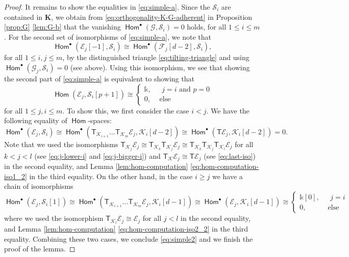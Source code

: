 \documentclass[a4paper,11pt, reqno]{amsart}
\def\KK{\mathbf K}
\def\sE{\mathscr{E}}
\def\sF{\mathscr{F}}
\def\sG{\mathscr{G}}
\def\sK{\mathscr{K}}
\def\sS{\mathscr{S}}
\newcommand{\opname}[1]{\operatorname{\mathsf{#1}}}
\newcommand{\Hom}{\opname{Hom}}
\newcommand{\bT}{\mathsf{T}}
\theoremstyle{plain}
\theoremstyle{definition}
\numberwithin{equation}{section}
\begin{document}
\begin{proof}
  It remains to show the equalities in \eqref{eq:simple-a}.
     Since the $\sS_i$ are contained in $\KK$, we obtain from \eqref{eq:orthogonality-K-G-adherent} in Proposition \ref{prop:G} \eqref{lem:G-b} that the vanishing $\Hom^\bullet (\sG , \sS_i ) = 0$ holds, for all $1\leq i \leq m$.
    For the second set of isomorphisms of \eqref{eq:simple-a}, we note that 
    \[
    \Hom^\bullet ( \sE_j [-1] , \sS_i ) \cong \Hom^\bullet (  \sF_{j} [d-2] , \sS_i  ) , 
    \]
    for all $1\leq i, j \leq m$, by the distinguished triangle \eqref{eq:tilting-triangle} and using $\Hom^\bullet (\sG_j , \sS_i ) = 0$ (see above).
    Using this isomorphism, 
    we see that showing the second part of \eqref{eq:simple-a} is equivalent to showing that
    \begin{equation}\label{eq:simple2}
         \Hom ( \sE_{j} , \sS_i [p+1] ) \cong 
        \begin{cases}
\mathbb k, &\text{ $j=i$ and $p=0$}\\
0 , &\text{ else}
\end{cases}
    \end{equation}
    for all $1\leq j , i \leq m$.
    To show this, we first consider the case $i<j$.
    We have the following equality of $\Hom$-spaces:
    \[
    \Hom^\bullet (  \sE_j , \sS_i ) \cong \Hom^\bullet (  \bT_{\sK_{i+1}} \ldots \bT_{\sK_{m}} \sE_j , \sK_{i} [d-2] ) \cong \Hom^\bullet (  \bT \sE_j , \sK_{i} [d-2] ) = 0 .
    \]
    Note that we used the isomorphisms $\bT_{\sK_j} \sE_j \cong \bT_{\sK_k}\bT_{\sK_j} \sE_j \cong \bT_{\sK_k}\bT_{\sK_j} \bT_{\sK_l} \sE_j $ for all $k<j<l$ (see \eqref{eq:j-lower-i} and \eqref{eq:j-bigger-i}) and $  \bT_{\sK} \sE_j \cong \bT\sE_j $ (see \eqref{eq:last-iso}) in the second equality, and Lemma \ref{lem:hom-computation} \eqref{eq:hom-computation-iso1_2} in the third equality.
    On the other hand, in the case $i\geq j$ we have a chain of isomorphisms
    \[
    \Hom^\bullet ( \sE_j , \sS_i [1] ) \cong   \Hom^\bullet (  \bT_{\sK_{i+1}} \ldots \bT_{\sK_{m}} \sE_j , \sK_{i} [d-1] ) \cong \Hom^\bullet (   \sE_j , \sK_{i} [d-1] ) \cong \begin{cases}
\mathbb k[0], &\text{ $j= i$}\\
0 , &\text{ else}
\end{cases}
    \]
    where we used the isomorphism $\bT_{\sK_l} \sE_j \cong \sE_j $ for all $j<l$ in the second equality, and Lemma \ref{lem:hom-computation} \eqref{eq:hom-computation-iso2_2} in the third equality.
    Combining these two cases, we conclude \eqref{eq:simple2} and we finish the proof of the lemma.
\end{proof}
\end{document}
